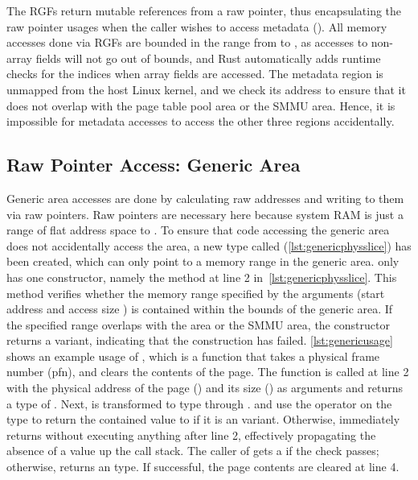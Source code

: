 The RGFs return mutable references from a raw pointer, thus encapsulating the
raw pointer usages when the caller wishes to access \rustcore{} metadata
().
All memory accesses done via RGFs are bounded in the range
from  to
,
as accesses to non-array fields will not go out of bounds,
and Rust automatically adds runtime checks for the indices when array fields are accessed.
The \rustcore{} metadata region is
unmapped from the host Linux kernel, and we check its address to ensure that it
does not overlap with the page table pool area or the SMMU area.
Hence, it is impossible for \rustcore{} metadata accesses to access
the other three regions accidentally.

\subsection{Raw Pointer Access: Generic Area}
Generic area accesses are done by calculating raw addresses and writing to them
via raw pointers. Raw pointers are necessary here because system RAM is just a
range of flat address space to \rustcore{}. To ensure that code accessing the
generic area does not accidentally access the \rustcore{} area,
a new type called 
(\autoref{lst:genericphysslice}) has been created, which can only point to a
memory range in the generic area.
 only has one constructor, namely the 
method at line 2 in~\autoref{lst:genericphysslice}. This method verifies whether
the memory range specified by the arguments (start address  and
access size ) is contained within the bounds of the generic area.
If the specified range overlaps with the \rustcore{} area or the SMMU area, the constructor
returns a  variant, indicating that the construction has failed.
\autoref{lst:genericusage} shows an example usage of
, which is a function that takes a physical frame number
(pfn), and clears the contents of the page.
The  function is called at line 2 with the
physical address of the page () and its size
() as arguments and returns a type of
.
Next,  is transformed to  type through .
and use the  operator on the  type to return the
contained value to  if it is an  variant.
Otherwise,  immediately returns 
without executing anything after line 2,
effectively propagating the absence of a value up the call stack.
The caller of  gets a
 if the check passes; otherwise,
 returns an  type.
If successful, the page contents are cleared at line 4.


